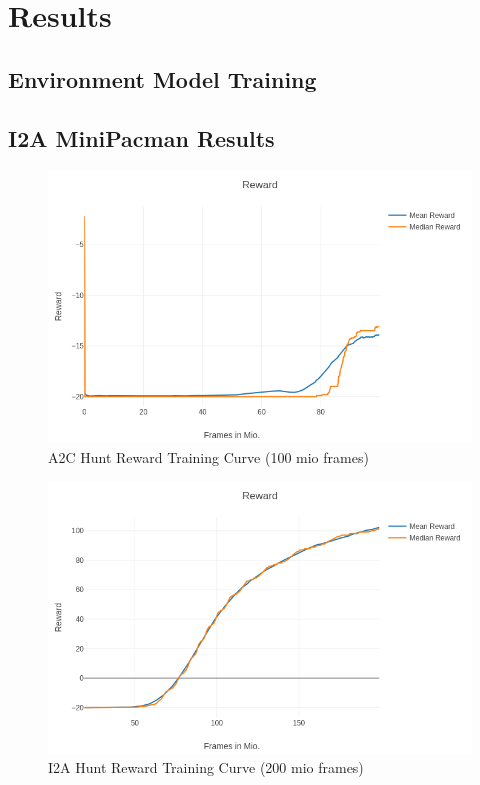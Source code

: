 \section{Results}

\subsection{Environment Model Training}


\subsection{I2A MiniPacman Results}

\begin{figure}[H] 
  \centering   
  \includegraphics[width=0.9\columnwidth]{./Images/a2c_hunt_reward.png}
  \caption{A2C Hunt Reward Training Curve (100 mio frames)} 
  \label{fig:environment_model_architecture} 
\end{figure} 


\begin{figure}[H] 
  \centering   
  \includegraphics[width=0.9\columnwidth]{./Images/i2a_hunt_reward_mean_and_median.png}
  \caption{I2A Hunt Reward Training Curve (200 mio frames)} 
  \label{fig:environment_model_architecture} 
\end{figure} 
